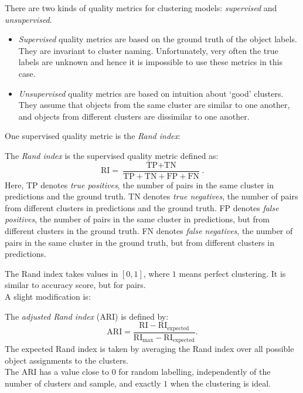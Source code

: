 There are two kinds of quality metrics for clustering models: \textit{supervised} and \textit{unsupervised}.
\begin{itemize}
\item \textit{Supervised} quality metrics are based on the ground truth of the object labels. They are invariant to cluster naming. Unfortunately, very often the true labels are unknown and hence it is impossible to use these metrics in this case.
\item \textit{Unsupervised} quality metrics are based on intuition about `good' clusters. They assume that objects from the same cluster are similar to one another, and objects from different clusters are dissimilar to one another.
\end{itemize}

One supervised quality metric is the \textit{Rand index}:
\begin{framedef}
The \textit{Rand index} is the supervised quality metric defined as:
\begin{equation*}
\text{RI} = \frac{\text{TP} + \text{TN}}{\text{TP} + \text{TN} + \text{FP} + \text{FN}}.
\end{equation*}
Here, TP denotes \textit{true positives}, the number of pairs in the same cluster in predictions and the ground truth. TN denotes \textit{true negatives}, the number of pairs from different clusters in predictions and the ground truth. FP denotes \textit{false positives}, the number of pairs in the same cluster in predictions, but from different clusters in the ground truth. FN denotes \textit{false negatives}, the number of pairs in the same cluster in the ground truth, but from different clusters in predictions.
\end{framedef}
The Rand index takes values in $[0,1]$, where $1$ means perfect clustering. It is similar to accuracy score, but for pairs.\\

A slight modification is:
\begin{framedef}
The \textit{adjusted Rand index} (ARI) is defined by:
\begin{equation*}
\text{ARI} = \frac{\text{RI} - \text{RI}_{\text{expected}}}{\text{RI}_{\text{max}} - \text{RI}_{\text{expected}}}.
\end{equation*}
The expected Rand index is taken by averaging the Rand index over all possible object assignments to the clusters. \\

The ARI has a value close to $0$ for random labelling, independently of the number of clusters and sample, and exactly $1$ when the clustering is ideal.
\end{framedef}

